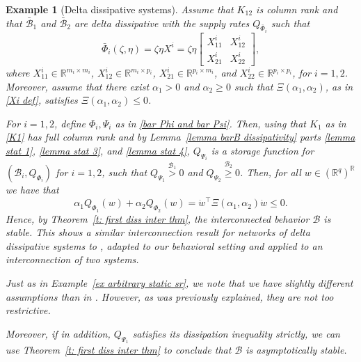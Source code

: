 \documentclass[letterpaper, 10 pt, conference]{ieeeconf}
\theoremstyle{ieeeconf}
\newtheorem{example}{Example}
\newcommand{\R}{\mathbb{R}}
\newcommand{\B}{\mathcal{B}}
\begin{document}
\begin{example}[Delta dissipative systems]			
	Assume that $K_{12}$ is column rank and that $\bar{\B}_1$ and $\bar{\B}_2$ are delta dissipative with the supply rates $Q_{\bar{\Phi}_i}$ such that
	\[\bar{\Phi}_i(\zeta,\eta)=\zeta \eta X^i=\zeta \eta \begin{bmatrix}
		X_{11}^i & X_{12}^i \\ X_{21}^i & X_{22}^i
	\end{bmatrix},\]where $X_{11}^i\in \R^{m_i \times m_i}$, $X_{12}^i\in \R^{m_i \times p_i}$, $X_{21}^i\in \R^{p_i \times m_i}$, and $X_{22}^i\in \R^{p_i \times p_i}$, for $i=1,2$.
	Moreover, assume that there exist $\alpha_1>0$ and $\alpha_2\geq 0$ such that $\Xi(\alpha_1,\alpha_2)$, as in \eqref{Xi def}, satisfies ${\Xi(\alpha_1,\alpha_2)\leq0}$.
	
	For $i=1,2$, define $\Phi_i,\Psi_i$ as in \eqref{bar Phi and bar Psi}. Then, using that $K_1$ as in \eqref{K1} has full column rank and by Lemma~\ref{lemma barB dissipativity} parts \ref{lemma stat 1}, \ref{lemma stat 3}, and \ref{lemma stat 4}, $Q_{\Psi_i}$ is a storage function for $(\B_i,Q_{\Phi_i})$ for $i=1,2$, such that $Q_{\Psi_1} \stackrel{\B_1}{>}0$ and $Q_{\Psi_2} \stackrel{\B_2}{\geq}0$. 
	Then, for all $w\in \left(\R^q\right)^\R$ we have that
	\begin{equation*}		\alpha_1Q_{\Phi_1}(w)+\alpha_2Q_{\Phi_2}(w)=\dot{w}^\top \Xi(\alpha_1,\alpha_2) \dot{w}\leq 0. 
	\end{equation*}
	Hence, by Theorem~\ref{t: first diss inter thm}, the interconnected behavior $\B$ is stable. This shows a similar interconnection result for networks of delta dissipative systems to \cite[Corollary~1]{schweidel_compositional_2022}, adapted to our behavioral setting and applied to an interconnection of two systems. 
	
	Just as in Example~\ref{ex arbitrary static sr}, we note that we have slightly different assumptions than in \cite[Corollary~1]{schweidel_compositional_2022}. However, as was previously explained, they are not too restrictive.
	
	Moreover, if in addition, $Q_{\Psi_1}$ satisfies its dissipation inequality strictly, we can use Theorem~\ref{t: first diss inter thm} to conclude that $\B$ is asymptotically stable.
\end{example}
\end{document}
